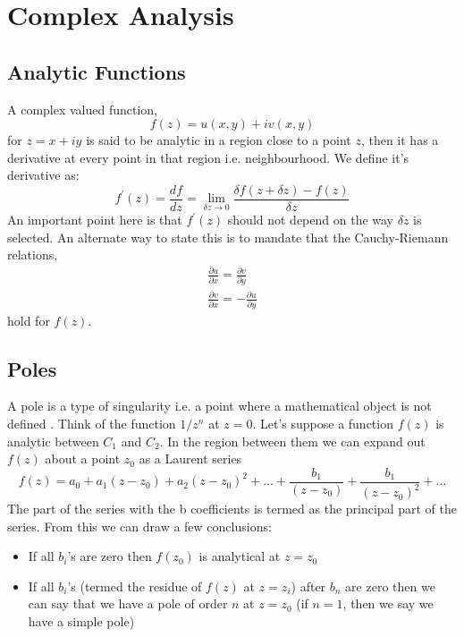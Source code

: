 \section{Complex Analysis}
\label{appendix_c}
\subsection{Analytic Functions}
A complex valued function, 
\begin{equation}
    f(z) = u(x,y) + iv(x,y)
\end{equation}
for $z = x + iy$ is said to be analytic in a region close to a point $z$, then it has a derivative at every point in that region i.e. neighbourhood. We define it's derivative as:
\begin{equation}
   f^{'}(z)  = \frac{df}{dz} = \lim_{\delta z  \rightarrow 0}\frac{\delta f(z + \delta z) - f(z)}{\delta z}
\end{equation}
An important point here is that $f^{'}(z)$ should not depend on the way $\delta z$ is selected. An alternate way to state this is to mandate that the Cauchy-Riemann relations,
\begin{equation}
    \begin{aligned}
    \frac{\partial u}{\partial x} = \frac{\partial v}{\partial y} \\
    \frac{\partial v}{\partial x} = - \frac{\partial u}{\partial y}
    \end{aligned}
\end{equation}
hold for $f(z)$.
\subsection{Poles}
A pole is a type of singularity i.e. a point where a mathematical object is not defined
. Think of the function $1/ z^{n}$ at $z = 0$. Let's suppose a function $f(z)$ is analytic between $C_{1}$ and $C_{2}$. In the region between them we can expand out $f(z)$ about a point $z_{0}$ as a Laurent series
\begin{equation}
    f(z) = a_{0} + a_{1} {(z- z_{0})} + a_{2} {(z- z_{0})}^{2} + ... + \frac{b_{1}}{{(z- z_{0})}} + \frac{b_{1}}{{(z- z_{0})}^{2}} + ...
\end{equation}
The part of the series with the b coefficients is termed as the principal part of the series. From this we can draw a few conclusions:
\begin{itemize}
    \item If all $b_{i}$'s are zero then $f(z_{0})$ is analytical at $z = z_{0}$
    \item If all $b_{i}$'s (termed the residue of $f(z)$ at $z = z_i$) after $b_{n}$ are zero then we can say that we have a pole of order $n$ at $z = z_0$ (if $n = 1$, then we say we have a simple pole)
    
\end{itemize}
